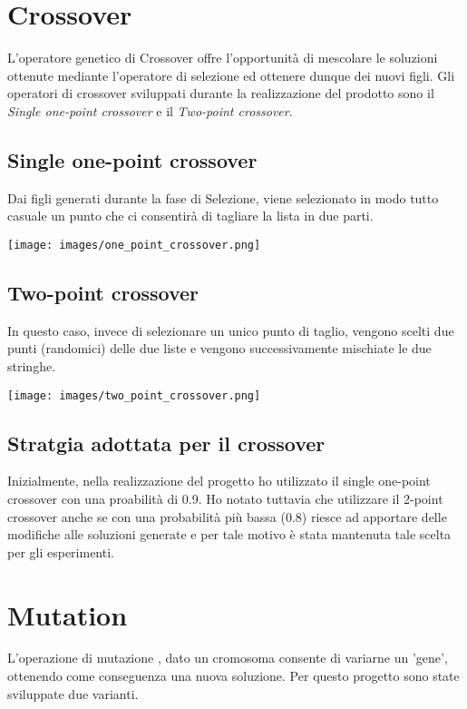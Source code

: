 \documentclass{article}
\begin{document}
\begin{enumerate}
\section{Crossover}
L'operatore genetico di Crossover offre l'opportunità di mescolare le soluzioni ottenute mediante l'operatore di selezione ed ottenere dunque dei nuovi figli. Gli operatori di crossover sviluppati durante la realizzazione del prodotto sono il \textit{Single one-point crossover} e il \textit{Two-point crossover}.

\subsection{Single one-point crossover}
Dai figli generati durante la fase di Selezione, viene selezionato in modo tutto casuale un punto che ci consentirà di tagliare la lista in due parti.

\begin{center}
\texttt{[image: images/one\_point\_crossover.png]}
\end{center}
\subsection{Two-point crossover}
In questo caso, invece di selezionare un unico punto di taglio, vengono scelti due punti (randomici) delle due liste e vengono successivamente mischiate le due stringhe.

\begin{center}
\texttt{[image: images/two\_point\_crossover.png]}
\end{center}
\subsection{Stratgia adottata per il crossover}

Inizialmente, nella realizzazione del progetto ho utilizzato il single one-point crossover con una proabilità di 0.9. Ho notato tuttavia che utilizzare il 2-point crossover anche se con una probabilità più bassa (0.8) riesce ad apportare delle modifiche alle soluzioni generate e per tale motivo è stata mantenuta tale scelta per gli esperimenti. 


\section{Mutation}
L'operazione di mutazione , dato un cromosoma consente di variarne un 'gene', ottenendo come conseguenza una nuova soluzione. Per questo progetto sono state sviluppate due varianti.


\end{enumerate}
\end{document}
